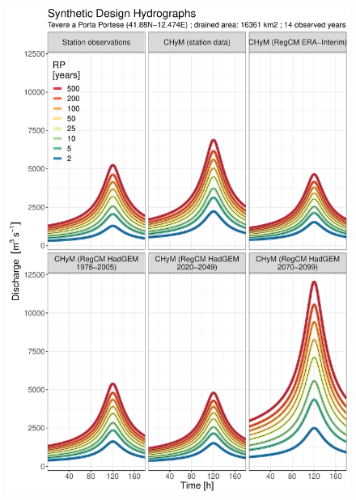 \begin{figure}
    \centering
        \includegraphics[width=0.45\textheight]{figures/valid_Q/SDH/id57_SDH_reg3_22}

\end{figure}
